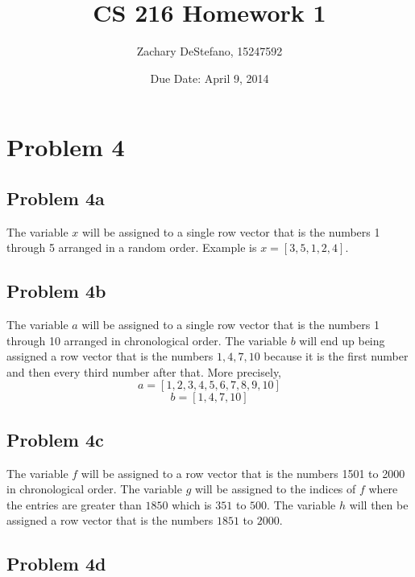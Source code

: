 \documentclass[11pt,psfig]{article}
\begin{document}
\setlength{\parskip}{1.2ex plus0.3ex minus 0.3ex}


\thispagestyle{empty} \pagestyle{myheadings} 



\title{CS 216 Homework 1}
\author{Zachary DeStefano, 15247592}
\date{Due Date: April 9, 2014}

\maketitle

\vfill\eject

\section*{Problem 4}

\subsection*{Problem 4a}

The variable $x$ will be assigned to a single row vector that is the numbers 1 through 5 arranged in a random order. Example is $x = [3,5,1,2,4]$.

\subsection*{Problem 4b}

The variable $a$ will be assigned to a single row vector that is the numbers 1 through 10 arranged in chronological order. The variable $b$ will end up being assigned a row vector that is the numbers $1,4,7,10$ because it is the first number and then every third number after that. More precisely,
\[
a = [1,2,3,4,5,6,7,8,9,10]
\]
\[
b = [1,4,7,10]
\]

\subsection*{Problem 4c}

The variable $f$ will be assigned to a row vector that is the numbers 1501 to 2000 in chronological order. The variable $g$ will be assigned to the indices of $f$ where the entries are greater than $1850$ which is $351$ to $500$. The variable $h$ will then be assigned a row vector that is the numbers $1851$ to $2000$.  

\subsection*{Problem 4d}
\end{document}
